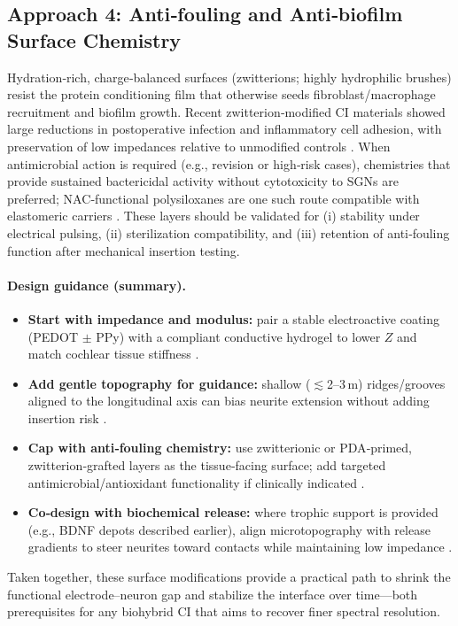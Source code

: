 \subsection{Approach 4: Anti‑fouling and Anti‑biofilm Surface Chemistry}
Hydration‑rich, charge‑balanced surfaces (zwitterions; highly hydrophilic brushes) resist the protein conditioning film that otherwise seeds fibroblast/macrophage recruitment and biofilm growth. Recent zwitterion‑modified CI materials showed large reductions in postoperative infection and inflammatory cell adhesion, with preservation of low impedances relative to unmodified controls \cite{Chen2023-ba,Horne2023}. When antimicrobial action is required (e.g., revision or high‑risk cases), chemistries that provide sustained bactericidal activity without cytotoxicity to SGNs are preferred; NAC‑functional polysiloxanes are one such route compatible with elastomeric carriers \cite{Cozma2021-jb}. These layers should be validated for (i) stability under electrical pulsing, (ii) sterilization compatibility, and (iii) retention of anti‑fouling function after mechanical insertion testing.

\paragraph{Design guidance (summary).}
\begin{itemize}
	\item \textbf{Start with impedance and modulus:} pair a stable electroactive coating (PEDOT $\pm$ PPy) with a compliant conductive hydrogel to lower $Z$ and match cochlear tissue stiffness \cite{Venkatraman2011-ql,Goding2017,Dalrymple2020}.
	\item \textbf{Add gentle topography for guidance:} shallow ($\lesssim$2--3\,\textmu m) ridges/grooves aligned to the longitudinal axis can bias neurite extension without adding insertion risk \cite{Wang2013,Chen2014,Lee2019}.
	\item \textbf{Cap with anti‑fouling chemistry:} use zwitterionic or PDA‑primed, zwitterion‑grafted layers as the tissue‑facing surface; add targeted antimicrobial/antioxidant functionality if clinically indicated \cite{Horne2023,Chen2023-ba,Cozma2021-jb,Schendzielorz2017}.
	\item \textbf{Co‑design with biochemical release:} where trophic support is provided (e.g., BDNF depots described earlier), align microtopography with release gradients to steer neurites toward contacts while maintaining low impedance \cite{Chikar2012,Goding2017}.
\end{itemize}
Taken together, these surface modifications provide a practical path to shrink the functional electrode–neuron gap and stabilize the interface over time—both prerequisites for any biohybrid CI that aims to recover finer spectral resolution.
